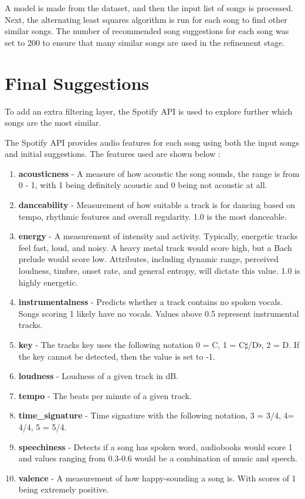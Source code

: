 A model is made from the dataset, and then the input list of songs is processed. Next, the alternating least squares algorithm is run for each song to find other similar songs. The number of recommended song suggestions for each song was set to 200 to ensure that many similar songs are used in the refinement stage.


\section{Final Suggestions}
To add an extra filtering layer, the Spotify API is used to explore further which songs are the most similar.

The Spotify API provides audio features for each song using both the input songs and initial suggestions. The features used are shown below \citep{spotify_web_2023}:

\begin{enumerate}
	\item \textbf{acousticness} - A measure of how acoustic the song sounds, the range is from 0 - 1, with 1 being definitely acoustic and 0 being not acoustic at all.
	\item \textbf{danceability} - Measurement of how suitable a track is for dancing based on tempo, rhythmic features and overall regularity. 1.0 is the most danceable. 
	\item \textbf{energy} - A measurement of intensity and activity. Typically, energetic tracks feel fast, loud, and noisy. A heavy metal track would score high, but a Bach prelude would score low. Attributes, including dynamic range, perceived loudness, timbre, onset rate, and general entropy, will dictate this value. 1.0 is highly energetic.
	\item \textbf{instrumentalness} - Predicts whether a track contains no spoken vocals. Songs scoring 1 likely have no vocals. Values above 0.5 represent instrumental tracks.
	\item \textbf{key} - The tracks key uses the following notation 0 = C, 1 = C$\sharp$/D$\flat$, 2 = D. If the key cannot be detected, then the value is set to -1.
	\item \textbf{loudness} - Loudness of a given track in dB.
	\item \textbf{tempo} - The beats per minute of a given track.
	\item \textbf{time\_signature} - Time signature with the following notation, 3 = 3/4, 4= 4/4, 5 = 5/4.
	\item \textbf{speechiness} - Detects if a song has spoken word, audiobooks would score 1 and values ranging from 0.3-0.6 would be a combination of music and speech.
	\item \textbf{valence} - A measurement of how happy-sounding a song is. With scores of 1 being extremely positive.
	
\end{enumerate}

